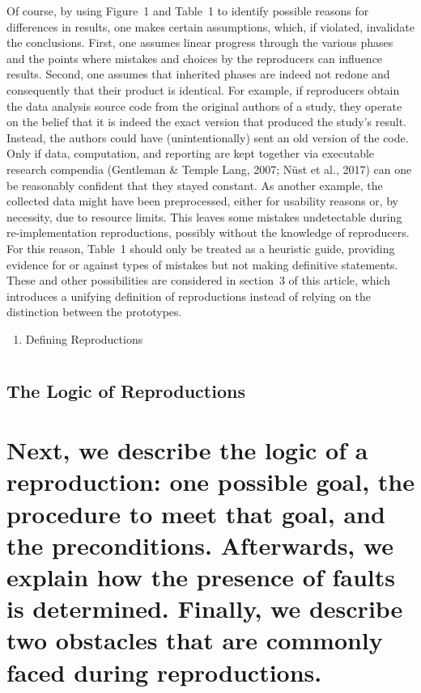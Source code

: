 \documentclass[authordate, empirical]{jote-new-article}
\begin{document}
	Of course, by using Figure 1 and Table 1 to identify possible reasons for differences in results, one makes certain assumptions, which, if violated, invalidate the conclusions. First, one assumes linear progress through the various phases and the points where mistakes and choices by the reproducers can influence results. Second, one assumes that inherited phases are indeed not redone and consequently that their product is identical. For example, if reproducers obtain the data analysis source code from the original authors of a study, they operate on the belief that it is indeed the exact version that produced the study's result. Instead, the authors could have (unintentionally) sent an old version of the code. Only if data, computation, and reporting are kept together via executable research compendia (Gentleman \& Temple Lang, 2007; Nüst et al., 2017) can one be reasonably confident that they stayed constant. As another example, the collected data might have been preprocessed, either for usability reasons or, by necessity, due to resource limits. This leaves some mistakes undetectable during re-implementation reproductions, possibly without the knowledge of reproducers. For this reason, Table 1 should only be treated as a heuristic guide, providing evidence for or against types of mistakes but not making definitive statements. These and other possibilities are considered in section 3 of this article, which introduces a unifying definition of reproductions instead of relying on the distinction between the prototypes.

	\begin{enumerate}


		\item Defining Reproductions


	\end{enumerate}

	\section{}



	\subsection{The Logic of Reproductions}



	\section{Next, we describe the logic of a reproduction: one possible goal, the procedure to meet that goal, and the preconditions. Afterwards, we explain how the presence of faults is determined. Finally, we describe two obstacles that are commonly faced during reproductions.}
\end{document}
